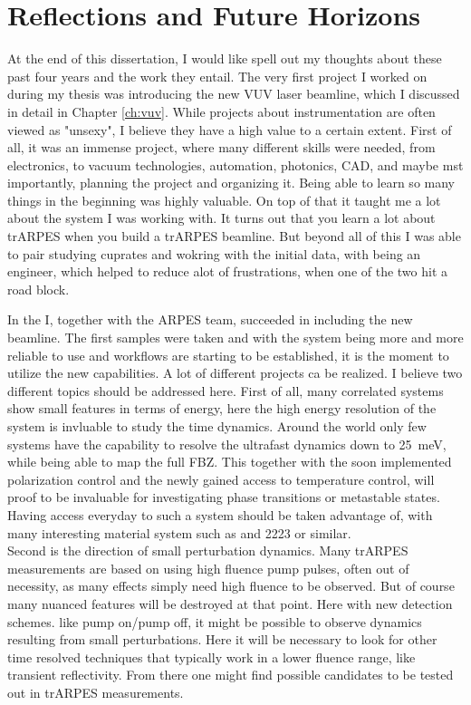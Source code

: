 \cleardoublepage
\chapter*{Reflections and Future Horizons}

At the end of this dissertation, I would like spell out my thoughts about these past four years and the work they entail.
The very first project I worked on during my thesis was introducing the new VUV laser beamline, which I discussed in detail in Chapter \ref{ch:vuv}.
While projects about instrumentation are often viewed as "unsexy", I believe they have a high value to a certain extent.
First of all, it was an immense project, where many different skills were needed, from electronics, to vacuum technologies, automation, photonics, CAD, and maybe mst importantly, planning the project and organizing it.
Being able to learn so many things in the beginning was highly valuable.
On top of that it taught me a lot about the system I was working with.
It turns out that you learn a lot about trARPES when you build a trARPES beamline.
But beyond all of this I was able to pair studying cuprates and wokring with the initial data, with being an engineer, which helped to reduce alot of frustrations, when one of the two hit a road block.

In the I, together with the ARPES team, succeeded in including the new beamline.
The first samples were taken and with the system being more and more reliable to use and workflows are starting to be established, it is the moment to utilize the new capabilities.
A lot of different projects ca be realized.
I believe two different topics should be addressed here.
First of all, many correlated systems show small features in terms of energy, here the high energy resolution of the system is invluable to study the time dynamics.
Around the world only few systems have the capability to resolve the ultrafast dynamics down to \qty{25}{\milli\electronvolt}, while being able to map the full FBZ.
This together with the soon implemented polarization control and the newly gained access to temperature control, will proof to be invaluable for investigating phase transitions or metastable states.
Having access everyday to such a system should be taken advantage of, with many interesting material system such as  and 2223 or similar.\\
Second is the direction of small perturbation dynamics.
Many trARPES measurements are based on using high fluence pump pulses, often out of necessity, as many effects simply need high fluence to be observed.
But of course many nuanced features will be destroyed at that point.
Here with new detection schemes. like pump on/pump off, it might be possible to observe dynamics resulting from small perturbations.
Here it will be necessary to look for other time resolved techniques that typically work in a lower fluence range, like transient reflectivity.
From there one might find possible candidates to be tested out in trARPES measurements.

